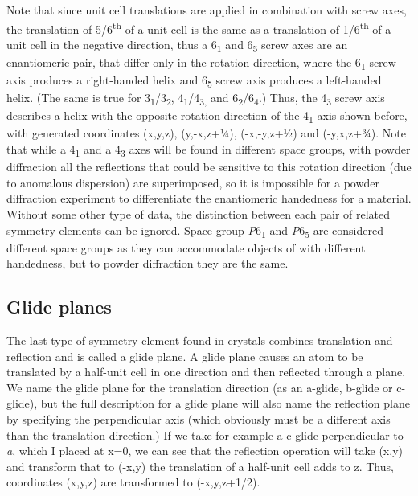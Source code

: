  Note that since unit cell translations are applied in combination with screw axes, the translation of 5/6\textsuperscript{th} of a unit cell is the same as a translation of 1/6\textsuperscript{th} of a unit cell in the negative direction, thus a 6\textsubscript{1} and 6\textsubscript{5 }screw axes are an enantiomeric pair, that differ only in the rotation direction, where the 6\textsubscript{1} screw axis produces a right-handed helix and 6\textsubscript{5 }screw axis produces a left-handed helix. (The same is true for 3\textsubscript{1}/3\textsubscript{2}, 4\textsubscript{1}/4\textsubscript{3,} and 6\textsubscript{2}/6\textsubscript{4}.) Thus, the 4\textsubscript{3 }screw axis describes a helix with the opposite rotation direction of the 4\textsubscript{1} axis shown before, with generated coordinates (x,y,z), (y,-x,z+¼), (-x,-y,z+½) and (-y,x,z+¾). Note that while a 4\textsubscript{1} and a 4\textsubscript{3} axes will be found in different space groups, with powder diffraction all the reflections that could be sensitive to this rotation direction (due to anomalous dispersion) are superimposed, so it is impossible for a powder diffraction experiment to differentiate the enantiomeric handedness for a material. Without some other type of data, the distinction between each pair of related symmetry elements can be ignored. Space group \textit{P}6\textsubscript{1} and \textit{P}6\textsubscript{5} are considered different space groups as they can accommodate objects of with different handedness, but to powder diffraction they are the same. 

\subsection{Glide planes} The last type of symmetry element found in crystals combines translation and reflection and is called a glide plane. A glide plane causes an atom to be translated by a half-unit cell in one direction and then reflected through a plane. We name the glide plane for the translation direction (as an a-glide, b-glide or c-glide), but the full description for a glide plane will also name the reflection plane by specifying the perpendicular axis (which obviously must be a different axis than the translation direction.) If we take for example a c-glide perpendicular to \textit{a}, which I placed at x=0, we can see that the reflection operation will take (x,y) and transform that to (-x,y) the translation of a half-unit cell adds to z. Thus, coordinates (x,y,z) are transformed to (-x,y,z+1/2).

